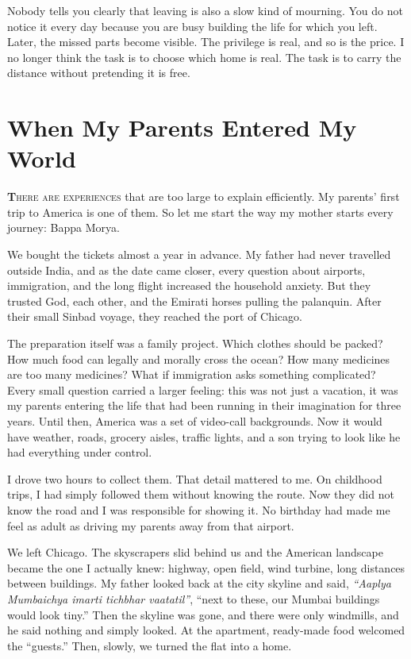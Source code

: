 \documentclass[11pt,twoside,openany]{book}
\newcommand{\dropcap}[2]{\lettrine[lines=3,findent=2pt,nindent=4pt]{\color{accent}\textsf{\textbf{#1}}}{#2}}
\begin{document}
Nobody tells you clearly that leaving is also a slow kind of mourning. You do
not notice it every day because you are busy building the life for which you
left. Later, the missed parts become visible. The privilege is real, and so is
the price. I no longer think the task is to choose which home is real. The
task is to carry the distance without pretending it is free.

\chapter{When My Parents Entered My World}

\dropcap{T}{here are experiences} that are too large to explain efficiently.
My parents' first trip to America is one of them. So let me start the way my
mother starts every journey: Bappa Morya.

We bought the tickets almost a year in advance. My father had never travelled
outside India, and as the date came closer, every question about airports,
immigration, and the long flight increased the household anxiety. But they
trusted God, each other, and the Emirati horses pulling the palanquin. After
their small Sinbad voyage, they reached the port of Chicago.

The preparation itself was a family project. Which clothes should be packed?
How much food can legally and morally cross the ocean? How many medicines are
too many medicines? What if immigration asks something complicated? Every
small question carried a larger feeling: this was not just a vacation, it was
my parents entering the life that had been running in their imagination for
three years. Until then, America was a set of video-call backgrounds. Now it
would have weather, roads, grocery aisles, traffic lights, and a son trying
to look like he had everything under control.

I drove two hours to collect them. That detail mattered to me. On childhood
trips, I had simply followed them without knowing the route. Now they did not
know the road and I was responsible for showing it. No birthday had made me
feel as adult as driving my parents away from that airport.

We left Chicago. The skyscrapers slid behind us and the American landscape
became the one I actually knew: highway, open field, wind turbine, long
distances between buildings. My father looked back at the city skyline and
said, \textit{``Aaplya Mumbaichya imarti tichbhar vaatatil''}, ``next to
these, our Mumbai buildings would look tiny.'' Then the skyline was gone, and
there were only windmills, and he said nothing and simply looked. At the
apartment, ready-made food welcomed the ``guests.'' Then, slowly, we turned
the flat into a home.
\end{document}
